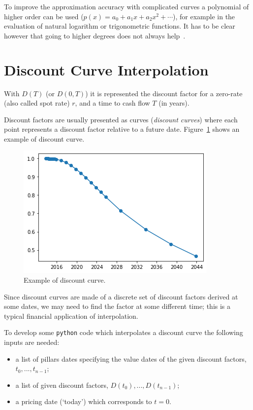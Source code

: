 To improve the approximation accuracy with complicated curves a polynomial of higher order can be used ($𝑝(𝑥)=𝑎_0 + 𝑎_1 𝑥+ 𝑎_2 𝑥^2+\cdots$), for example in the evaluation of natural logarithm or trigonometric functions. It has to be clear however that going to higher degrees does not always help~\cite{bib:runge}.

\section{Discount Curve Interpolation}
\label{discount-curve-interpolation}
With $D(T)$ (or $D(0,T)$) it is represented the discount factor for a zero-rate (also called spot rate) $r$, and a time to cash flow $T$ (in years).

Discount factors are usually presented as curves (\emph{discount curves}) where each point represents a discount factor relative to a future date. Figure~\ref{fig:example_discount_curve} shows an example of discount curve.

\begin{figure}[htbp]
	\centering
	\includegraphics[width=0.7\linewidth]{figures/discount_curve}
	\caption{Example of discount curve.}
	\label{fig:example_discount_curve}
\end{figure}

Since discount curves are made of a discrete set of discount factors derived at some dates, we may need to find the factor at some different time; this is a typical financial application of interpolation.

To develop some \texttt{python} code which interpolates a discount curve the following inputs are needed:

\begin{itemize}
\tightlist
\item a list of pillars dates specifying the value dates of the given discount factors, \(t_0,...,t_{n-1}\);
\item a list of given discount factors, \(D(t_0),...,D(t_{n-1})\);
\item a pricing date (`today') which corresponds to \(t=0\).
\end{itemize}

